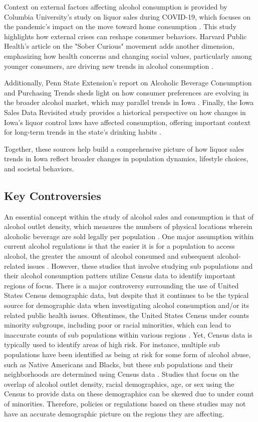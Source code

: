 \documentclass{article}
\begin{document}
Context on external factors affecting alcohol consumption is provided by Columbia University’s study on liquor sales during COVID-19, which focuses on the pandemic’s impact on the move toward home consumption \cite{columbia_study}. This study highlights how external crises can reshape consumer behaviors. Harvard Public Health’s article on the "Sober Curious" movement adds another dimension, emphasizing how health concerns and changing social values, particularly among younger consumers, are driving new trends in alcohol consumption \cite{harvard_sober_curious}.

Additionally, Penn State Extension’s report on Alcoholic Beverage Consumption and Purchasing Trends sheds light on how consumer preferences are evolving in the broader alcohol market, which may parallel trends in Iowa \cite{penn_state_extension}. Finally, the Iowa Sales Data Revisited study provides a historical perspective on how changes in Iowa’s liquor control laws have affected consumption, offering important context for long-term trends in the state’s drinking habits \cite{iowa_sales_revisited}.

Together, these sources help build a comprehensive picture of how liquor sales trends in Iowa reflect broader changes in population dynamics, lifestyle choices, and societal behaviors.

\subsection{Key Controversies}
An essential concept within the study of alcohol sales and consumption is that of alcohol outlet density, which measures the numbers of physical locations wherein alcoholic beverage are sold legally per population \cite{campbell2009effectiveness}. One major assumption within current alcohol regulations is that the easier it is for a population to access alcohol, the greater the amount of alcohol consumed and subsequent alcohol-related issues \cite{babor2010alcohol}. However, these studies that involve studying sub populations and their alcohol consumption patters utilize Census data to identify important regions of focus. There is a major controversy surrounding the use of United States Census demographic data, but despite that it continues to be the typical source for demographic data when investigating alcohol consumption and/or its related public health issues. Oftentimes, the United States Census under counts minority subgroups, including poor or racial minorities, which can lead to inaccurate counts of sub populations within various regions \cite{anderson2000race}. Yet, Census data is typically used to identify areas of high risk. For instance, multiple sub populations have been identified as being at risk for some form of alcohol abuse, such as Native Americans and Blacks, but these sub populations and their neighborhoods are determined using Census data \cite{delker2016alcohol}. Studies that focus on the overlap of alcohol outlet density, racial demographics, age, or sex using the Census to provide data on these demographics can be skewed due to under count of minorities. Therefore, policies or regulations based on these studies may not have an accurate demographic picture on the regions they are affecting. 
\end{document}
